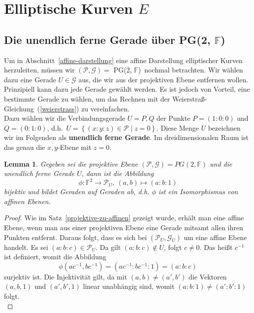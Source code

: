 \documentclass[hidelinks]{article}
\theoremstyle{plain}
\newtheorem{lem}[thm]{Lemma}
\theoremstyle{definition}
\theoremstyle{rem}
\newcommand{\pgtwo}{PG(2, $\mathbb{F}$)\ }
\begin{document}
\begin{sloppypar}
\section{Elliptische Kurven $E$}
\subsection{Die unendlich ferne Gerade über \pgtwo}
Um in Abschnitt~\ref{affine-darstellung} eine affine Darstellung elliptischer Kurven herzuleiten, müssen wir $(\mathcal{P,G}) =$ \pgtwo nochmal betrachten.
Wir wählen dazu eine Gerade $U \in \mathcal{G}$ aus, die wir aus der projektiven Ebene entfernen wollen. Prinzipiell kann dazu jede Gerade gewählt werden. 
Es ist jedoch von Vorteil, eine bestimmte Gerade zu wählen, um das Rechnen mit der Weierstraß-Gleichung~(\ref{weierstrass}) zu vereinfachen. \\
\newline
Dazu wählen wir die Verbindungsgerade $U = \overline{P,Q}$ der Punkte $P = (1:0:0)$ und $Q = (0:1:0)$, d.h.\ $U = \left\{ (x:y:z) \in \mathcal{P} \mid z = 0 \right\}$. 
Diese Menge $U$ bezeichnen wir im Folgenden als \textbf{unendlich ferne Gerade}.
Im dreidimensionalen Raum ist das genau die $x,y$-Ebene mit $z=0$.
\begin{lem}
    Gegeben sei die projektive Ebene $(\mathcal{P}, \mathcal{G}) = PG(2,\mathbb{F})$ und die unendlich ferne Gerade $U$, dann ist die Abbildung
    \begin{equation*}
        \phi: \mathbb{F}^2 \rightarrow \mathcal{P}_U,\ (a,b) \mapsto (a:b:1)
    \end{equation*}
    bijektiv und bildet Geraden auf Geraden ab, d.h. $\phi$ ist ein Isomorphismus von affinen Ebenen. 
\end{lem}
\begin{proof} \label{isomorphismus-lemma}
    Wie im Satz~\ref{projektive-zu-affinen} gezeigt wurde, erhält man eine affine Ebene, wenn man aus einer projektiven Ebene eine Gerade mitsamt allen ihren Punkten entfernt. Daraus folgt, dass es sich bei $(\mathcal{P}_U, \mathcal{G}_U)$ um eine affine Ebene handelt. Es sei $(a:b:c) \in \mathcal{P}_U$. Da gilt $(a:b:c) \notin U$, folgt $c \neq 0$. Das heißt $c^{-1}$ ist definiert, womit die Abbildung
    \begin{equation*}
        \phi(ac^{-1},bc^{-1}) = (ac^{-1}:bc^{-1}:1) = (a:b:c)
    \end{equation*}
    surjektiv ist. Die Injektivität gilt, da mit $(a,b) \neq (a',b')$ die Vektoren $(a,b,1)$ und $(a',b',1)$ linear unabhängig sind, womit $(a:b:1) \neq (a':b':1)$ folgt. \\

\end{proof}
\end{sloppypar}
\end{document}
